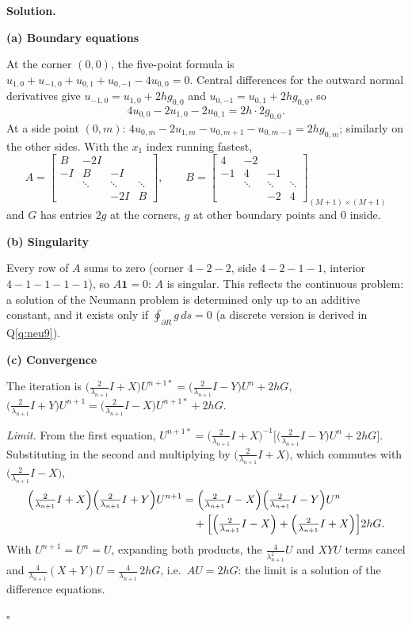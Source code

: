 \documentclass[11pt,a4paper]{article}
\newenvironment{solution}
  {\par\noindent\textbf{Solution.}\par\nobreak}
  {\par\nobreak\noindent\hfill\(\square\)\par}
\newcommand{\step}[1]{\par\addvspace{0.5em}\noindent\textbf{#1}\par\nobreak}
\newcommand{\lam}{\lambda_{n+1}}
\begin{document}
\begin{solution}
\step{(a) Boundary equations}
At the corner \((0,0)\), the five-point formula is
\(u_{1,0}+u_{-1,0}+u_{0,1}+u_{0,-1}-4u_{0,0}=0\).  Central differences
for the outward normal derivatives give
\(u_{-1,0}=u_{1,0}+2hg_{0,0}\) and \(u_{0,-1}=u_{0,1}+2hg_{0,0}\), so
\[
  4u_{0,0}-2u_{1,0}-2u_{0,1}=2h\cdot2g_{0,0}.
\]
At a side point \((0,m)\):
\(4u_{0,m}-2u_{1,m}-u_{0,m+1}-u_{0,m-1}=2hg_{0,m}\); similarly on the
other sides.  With the \(x_1\) index running fastest,
\[
  A=\begin{bmatrix}B&-2I&&\\-I&B&-I&\\&\ddots&\ddots&\ddots\\&&-2I&B\end{bmatrix},
  \qquad
  B=\begin{bmatrix}4&-2&&\\-1&4&-1&\\&\ddots&\ddots&\ddots\\&&-2&4\end{bmatrix}_{(M+1)\times(M+1)}
\]
and \(G\) has entries \(2g\) at the corners, \(g\) at other boundary
points and \(0\) inside.

\step{(b) Singularity}
Every row of \(A\) sums to zero (corner \(4-2-2\), side \(4-2-1-1\),
interior \(4-1-1-1-1\)), so \(A\mathbf1=0\): \(A\) is singular.  This
reflects the continuous problem: a solution of the Neumann problem is
determined only up to an additive constant, and it exists only if
\(\oint_{\partial R}g\,ds=0\) (a discrete version is derived in
Q\ref{q:neu9}).

\step{(c) Convergence}
The iteration is
\(\bigl(\frac2{\lam}I+X\bigr)U^{n+1*}=\bigl(\frac2{\lam}I-Y\bigr)U^n+2hG\),
\(\bigl(\frac2{\lam}I+Y\bigr)U^{n+1}=\bigl(\frac2{\lam}I-X\bigr)U^{n+1*}+2hG\).

\emph{Limit.} From the first equation,
\(U^{n+1*}=\bigl(\frac2{\lam}I+X\bigr)^{-1}\bigl[\bigl(\frac2{\lam}I-Y\bigr)U^n+2hG\bigr]\).
Substituting in the second and multiplying by
\(\bigl(\frac2{\lam}I+X\bigr)\), which commutes with
\(\bigl(\frac2{\lam}I-X\bigr)\),
\begin{align*}
  \Bigl(\tfrac2{\lam}I+X\Bigr)\Bigl(\tfrac2{\lam}I+Y\Bigr)U^{n+1}
  &=\Bigl(\tfrac2{\lam}I-X\Bigr)\Bigl(\tfrac2{\lam}I-Y\Bigr)U^n\\
  &\quad+\Bigl[\Bigl(\tfrac2{\lam}I-X\Bigr)+\Bigl(\tfrac2{\lam}I+X\Bigr)\Bigr]2hG .
\end{align*}
With \(U^{n+1}=U^n=U\), expanding both products, the
\(\frac4{\lam^2}U\) and \(XYU\) terms cancel and
\(\frac4{\lam}(X+Y)U=\frac4{\lam}\,2hG\), i.e.\ \(AU=2hG\): the limit is a
solution of the difference equations.


\end{solution}
\end{document}
